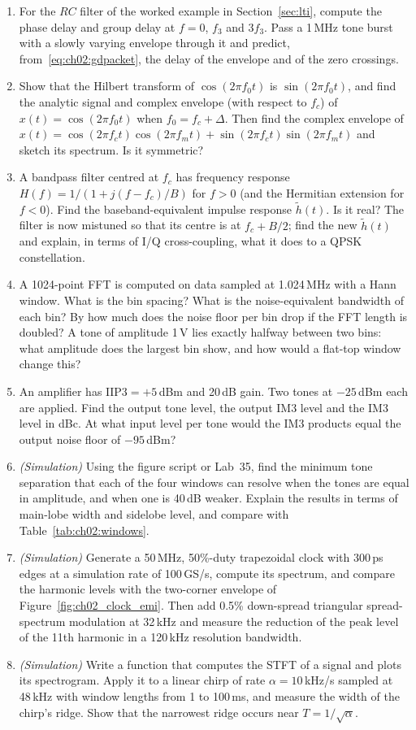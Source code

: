\begin{enumerate}[label=\thechapter.\arabic*]
tell from the group delay?
\item For the $RC$ filter of the worked example in Section~\ref{sec:lti}, compute the phase delay and
group delay at $f=0$, $f_3$ and $3f_3$. Pass a 1\,MHz tone burst with a slowly varying envelope through
it and predict, from~\eqref{eq:ch02:gdpacket}, the delay of the envelope and of the zero crossings.
\item Show that the Hilbert transform of $\cos(2\pi f_0 t)$ is $\sin(2\pi f_0 t)$, and find
the analytic signal and complex envelope (with respect to $f_c$) of
$x(t)=\cos(2\pi f_0 t)$ when $f_0=f_c+\Delta$. Then find the complex envelope of
$x(t)=\cos(2\pi f_ct)\cos(2\pi f_mt)+\sin(2\pi f_ct)\sin(2\pi f_mt)$ and sketch its spectrum. Is it
symmetric?
\item A bandpass filter centred at $f_c$ has frequency response $H(f)=1/(1+j(f-f_c)/B)$ for $f>0$
(and the Hermitian extension for $f<0$). Find the baseband-equivalent impulse response $\tilde h(t)$.
Is it real? The filter is now mistuned so that its centre is at $f_c+B/2$; find the new $\tilde h(t)$ and
explain, in terms of I/Q cross-coupling, what it does to a QPSK constellation.
\item A 1024-point FFT is computed on data sampled at 1.024\,MHz with a Hann window. What
is the bin spacing? What is the noise-equivalent bandwidth of each bin? By how much does the noise
floor per bin drop if the FFT length is doubled? A tone of amplitude 1\,V lies exactly halfway between
two bins: what amplitude does the largest bin show, and how would a flat-top window change this?
\item An amplifier has $\text{IIP3}=+5$\,dBm and 20\,dB gain. Two tones at $-25$\,dBm each are applied.
Find the output tone level, the output IM3 level and the IM3 level in dBc. At what input level per tone
would the IM3 products equal the output noise floor of $-95$\,dBm?
\item \emph{(Simulation)} Using the figure script or Lab~35, find the minimum tone separation that
each of the four windows can resolve when the tones are equal in amplitude, and when one
is 40\,dB weaker. Explain the results in terms of main-lobe width and sidelobe level, and compare with
Table~\ref{tab:ch02:windows}.
\item \emph{(Simulation)} Generate a 50\,MHz, 50\%-duty trapezoidal clock with 300\,ps edges at a
simulation rate of 100\,GS/s, compute its spectrum, and compare the harmonic levels with the
two-corner envelope of Figure~\ref{fig:ch02_clock_emi}. Then add 0.5\% down-spread triangular
spread-spectrum modulation at 32\,kHz and measure the reduction of the peak level of the 11th harmonic
in a 120\,kHz resolution bandwidth.
\item \emph{(Simulation)} Write a function that computes the STFT of a signal and plots its spectrogram.
Apply it to a linear chirp of rate $\alpha=10$\,kHz/s sampled at 48\,kHz with window lengths from 1 to
100\,ms, and measure the width of the chirp's ridge. Show that the narrowest ridge occurs near
$T=1/\sqrt\alpha$.
\end{enumerate}

